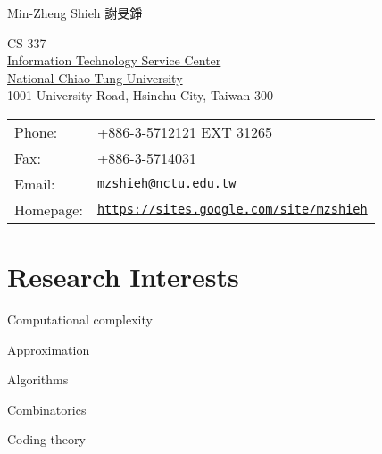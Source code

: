 \documentclass[A4]{article}
\def\name{Min-Zheng Shieh {\Kai 謝旻錚}}
\renewenvironment{itemize}{
  \begin{list}{}{
    \setlength{\leftmargin}{1.5em}
  }
}{
  \end{list}
}
\begin{document}
{\huge \name}


\vspace{0.25in}

\begin{minipage}{0.45\linewidth}
  CS 337\\
	\href{http://www.it.nctu.edu.tw/}{Information Technology Service Center}\\
  \href{http://www.nctu.edu.tw/}{National Chiao Tung University} \\
  1001 University Road, Hsinchu City, Taiwan 300
\end{minipage}
\begin{minipage}{0.45\linewidth}
  \begin{tabular}{ll}
    Phone: & +886-3-5712121 EXT 31265 \\
    Fax: & +886-3-5714031 \\
    Email: & \href{mailto:mzshieh@nctu.edu.tw}{\tt mzshieh@nctu.edu.tw} \\
    Homepage: & \href{http://sites.google.com/site/mzshieh}{\tt https://sites.google.com/site/mzshieh} \\
  \end{tabular}
\end{minipage}

\section*{Research Interests}
\begin{itemize}
\item Computational complexity
\item Approximation
\item Algorithms
\item Combinatorics
\item Coding theory
\end{itemize}


\end{document}
